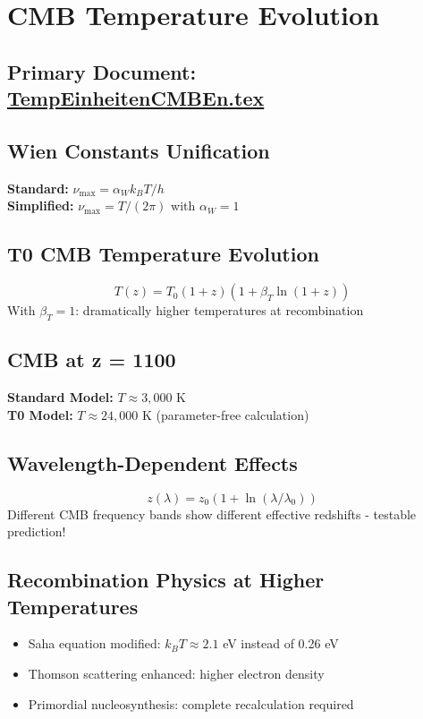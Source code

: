 \documentclass[12pt,a4paper]{report}
\begin{document}
	\section{CMB Temperature Evolution}
	\subsection{Primary Document: \href{https://github.com/jpascher/T0-Time-Mass-Duality/tree/main/2/pdf/TempEinheitenCMBEn.pdf}{TempEinheitenCMBEn.tex}}
	
	\subsection{Wien Constants Unification}
	\textbf{Standard:} $\nu_{\text{max}} = \alpha_W k_B T/h$\\
	\textbf{Simplified:} $\nu_{\text{max}} = T/(2\pi)$ with $\alpha_W = 1$
	
	\subsection{T0 CMB Temperature Evolution}
	$$T(z) = T_0(1+z)(1 + \beta_T \ln(1+z))$$
	With $\beta_T = 1$: dramatically higher temperatures at recombination
	
	\subsection{CMB at z = 1100}
	\textbf{Standard Model:} $T \approx 3,000$ K\\
	\textbf{T0 Model:} $T \approx 24,000$ K (parameter-free calculation)
	
	\subsection{Wavelength-Dependent Effects}
	$$z(\lambda) = z_0(1 + \ln(\lambda/\lambda_0))$$
	Different CMB frequency bands show different effective redshifts - testable prediction!
	
	\subsection{Recombination Physics at Higher Temperatures}
	\begin{itemize}
		\item Saha equation modified: $k_B T \approx 2.1$ eV instead of 0.26 eV
		\item Thomson scattering enhanced: higher electron density
		\item Primordial nucleosynthesis: complete recalculation required
	\end{itemize}
	
\end{document}
